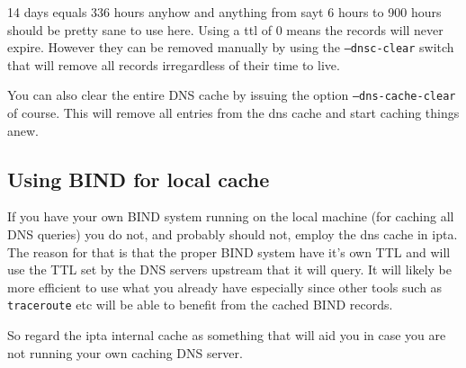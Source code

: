 \documentclass[english,twoside,openright,a4paper,12pt]{article}
\begin{document}
14 days equals 336 hours anyhow and anything from sayt 6 hours to 900
hours should be pretty sane to use here. Using a ttl of 0 means the
records will never expire. However they can be removed manually by
using the \texttt{--dnsc-clear} switch that will remove all records
irregardless of their time to live.

You can also clear the entire DNS cache by issuing the option
\texttt{--dns-cache-clear} of course. This will remove all entries
from the dns cache and start caching things anew.

\subsection{Using BIND for local cache}

If you have your own BIND system running on the local machine (for
caching all DNS queries) you do not, and probably should not, employ
the dns cache in ipta. The reason for that is that the proper BIND
system have it's own TTL and will use the TTL set by the DNS servers
upstream that it will query. It will likely be more efficient to use
what you already have especially since other tools such as
\texttt{traceroute} etc will be able to benefit from the cached BIND
records.

So regard the ipta internal cache as something that will aid you in
case you are not running your own caching DNS server.
\end{document}
